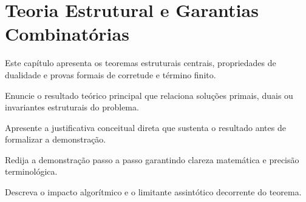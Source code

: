 \chapter{Teoria Estrutural e Garantias Combinatórias}\label{sec:teoria_estrutural}

Este capítulo apresenta os teoremas estruturais centrais, propriedades de dualidade e provas formais de corretude e término finito.

\begin{teorema}
Enuncie o resultado teórico principal que relaciona soluções primais, duais ou invariantes estruturais do problema.
\end{teorema}

 Apresente a justificativa conceitual direta que sustenta o resultado antes de formalizar a demonstração.

\begin{demonstracao}
Redija a demonstração passo a passo garantindo clareza matemática e precisão terminológica.
\end{demonstracao}

 Descreva o impacto algorítmico e o limitante assintótico decorrente do teorema.
